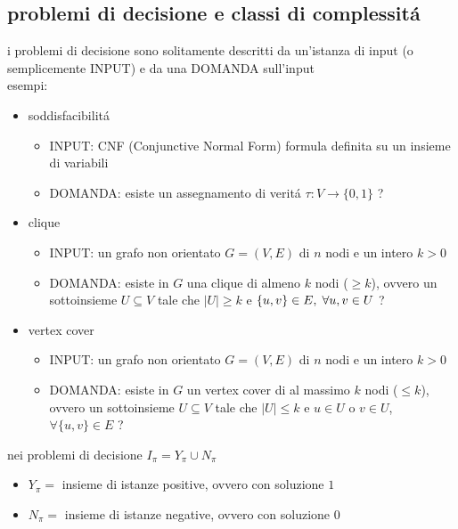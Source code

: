 \subsection*{problemi di decisione e classi di complessit\'a}
\begin{flushleft}
	i problemi di decisione sono solitamente descritti da un'istanza di input (o semplicemente INPUT) e da una DOMANDA sull'input \newline \\
	esempi:
	\begin{itemize}
		\item soddisfacibilit\'a
			\begin{itemize}
				\item INPUT: CNF (Conjunctive Normal Form) formula definita su un insieme di variabili
				\item DOMANDA: esiste un assegnamento di verit\'a $\tau:V\rightarrow\{0,1\}$ ?
			\end{itemize}
		\item clique
			\begin{itemize}
				\item INPUT: un grafo non orientato $G=(V,E)$ di $n$ nodi e un intero $k>0$
				\item DOMANDA: esiste in $G$ una clique di almeno $k$ nodi ($\geq k$), ovvero un sottoinsieme $U\subseteq V$ tale che $|U|\geq k$ e $\{u,v\}\in E,\hspace{0.1cm}\forall u,v\in U$ ?
			\end{itemize}
		\item vertex cover
			\begin{itemize}
				\item INPUT: un grafo non orientato $G=(V,E)$ di $n$ nodi e un intero $k>0$
				\item DOMANDA: esiste in $G$ un vertex cover di al massimo $k$ nodi ($\leq k$), ovvero un sottoinsieme $U\subseteq V$ tale che $|U|\leq k$ e $u\in U$ o $v\in U$, $\forall\{u,v\}\in E$ ?
			\end{itemize}
	\end{itemize}
	nei problemi di decisione $I_{\pi}=Y_{\pi}\cup N_{\pi}$
	\begin{itemize}
		\item $Y_{\pi}=$ insieme di istanze positive, ovvero con soluzione $1$
		\item $N_{\pi}=$ insieme di istanze negative, ovvero con soluzione $0$
	\end{itemize}
\end{flushleft}

